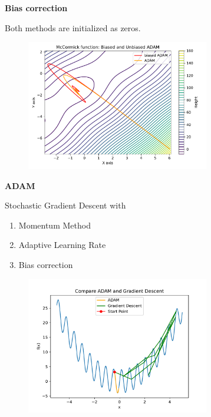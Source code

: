 \documentclass{beamer}
\newcommand\myheading[1]{%
  \par\bigskip
  {\Large\bfseries#1}\par\smallskip}
\begin{document}
\begin{frame}
    \myheading{Bias correction}
    Both methods are initialized as zeros.
    
    \begin{figure}[h]
        \includegraphics[width=8cm]{report/figures/ADAM_bias.pdf}
    \end{figure}
\end{frame}



\begin{frame}
    \myheading{ADAM}
    Stochastic Gradient Descent with
    \begin{enumerate}
        \item Momentum Method
        \item Adaptive Learning Rate
        \item Bias correction
    \end{enumerate}
    
    \begin{figure}[h]
        \includegraphics[width=8cm]{report/figures/adam_vs_gradientdescent.pdf}
    \end{figure}
\end{frame}
\end{document}
